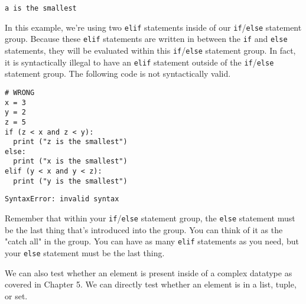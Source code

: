 \begin{lstlisting}
a is the smallest
\end{lstlisting}
In this example, we're using two \verb|elif| statements inside of our \verb|if|/\verb|else| statement group. Because these \verb|elif| statements are written in between the \verb|if| and \verb|else| statements, they will be evaluated within this \verb|if|/\verb|else| statement group. In fact, it is syntactically illegal to have an \verb|elif| statement outside of the \verb|if|/\verb|else| statement group. The following code is not syntactically valid.\par
\begin{lstlisting}[style=pippython]
# WRONG
x = 3
y = 2
z = 5
if (z < x and z < y):
  print ("z is the smallest")
else:
  print ("x is the smallest")
elif (y < x and y < z):
  print ("y is the smallest")
\end{lstlisting}
\begin{lstlisting}
SyntaxError: invalid syntax
\end{lstlisting}
Remember that within your \verb|if|/\verb|else| statement group, the \verb|else| statement must be the last thing that's introduced into the group. You can think of it as the "catch all" in the group. You can have as many \verb|elif| statements as you need, but your \verb|else| statement must be the last thing.\par
We can also test whether an element is present inside of a complex datatype as covered in Chapter 5. We can directly test whether an element is in a list, tuple, or set.\par
{}
